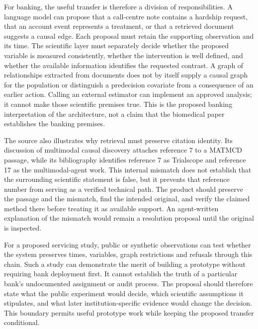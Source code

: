 For banking, the useful transfer is therefore a division of responsibilities.
A language model can propose that a call-centre note contains a hardship
request, that an account event represents a treatment, or that a retrieved
document suggests a causal edge. Each proposal must retain the supporting
observation and its time. The scientific layer must separately decide whether
the proposed variable is measured consistently, whether the intervention is
well defined, and whether the available information identifies the requested
contrast. A graph of relationships extracted from documents does not by itself
supply a causal graph for the population or distinguish a predecision
covariate from a consequence of an earlier action. Calling an external
estimator can implement an approved analysis; it cannot make those scientific
premises true. This is the proposed banking interpretation of the architecture,
not a claim that the biomedical paper establishes the banking premises.

The source also illustrates why retrieval must preserve citation identity.
Its discussion of multimodal causal discovery attaches reference 7 to a
MATMCD passage, while its bibliography identifies reference 7 as Trialscope
and reference 17 as the multimodal-agent work. This internal mismatch does
not establish that the surrounding scientific statement is false, but it
prevents that reference number from serving as a verified technical path.
The product should preserve the passage and the mismatch, find the intended
original, and verify the claimed method there before treating it as available
support. An agent-written explanation of the mismatch would remain a
resolution proposal until the original is inspected.~\citep{exec18_reasoning_biomedical}

For a proposed servicing study, public or synthetic observations can test
whether the system preserves times, variables, graph restrictions and refusals
through this chain. Such a study can demonstrate the merit of building a
prototype without requiring bank deployment first. It cannot establish the
truth of a particular bank's undocumented assignment or audit process. The
proposal should therefore state what the public experiment would decide,
which scientific assumptions it stipulates, and what later institution-specific
evidence would change the decision. This boundary permits useful prototype
work while keeping the proposed transfer conditional.

